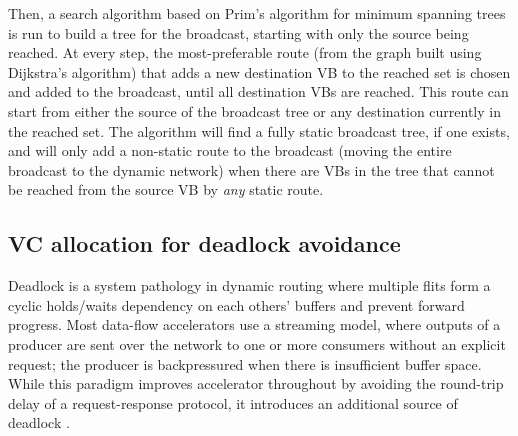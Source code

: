 Then, a search algorithm based on Prim's algorithm for minimum spanning trees \cite{prim1957shortest} is run to build a tree for the broadcast, starting with only the source being reached.
At every step, the most-preferable route (from the graph built using Dijkstra's algorithm) that adds a new destination VB to the reached set is chosen and added to the broadcast, until all destination VBs are reached. 
This route can start from either the source of the broadcast tree or any destination currently in the reached set.
The algorithm will find a fully static broadcast tree, if one exists, and will only add a non-static route to the broadcast (moving the entire broadcast to the dynamic network) when there are VBs in the tree that cannot be reached from the source VB by \emph{any} static route.

\subsection{VC allocation for deadlock avoidance} \label{sec:vc_alloc}
Deadlock is a system pathology in dynamic routing where multiple flits form a cyclic holds/waits dependency on each others' buffers and prevent forward progress.
Most data-flow accelerators use a streaming model, where outputs of a producer are sent over the network to one or more consumers
without an explicit request; the producer is backpressured when there is insufficient buffer space. 
While this paradigm improves accelerator throughout by avoiding the round-trip delay of a request-response protocol, it introduces an additional source of deadlock \cite{hansson2007avoiding}. 

